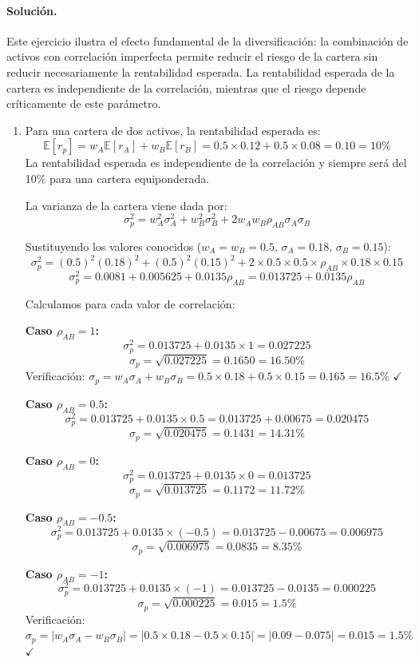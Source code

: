 \documentclass[12pt,a4paper]{article}
\newcommand{\E}{\mathbb{E}}
\newenvironment{solucion}{\paragraph{Solución.}}{}
\begin{document}
\begin{solucion}
Este ejercicio ilustra el efecto fundamental de la diversificación: la combinación de activos con correlación imperfecta permite reducir el riesgo de la cartera sin reducir necesariamente la rentabilidad esperada. La rentabilidad esperada de la cartera es independiente de la correlación, mientras que el riesgo depende críticamente de este parámetro.

\begin{enumerate}[label=\alph*)]
  \item Para una cartera de dos activos, la rentabilidad esperada es:
  \[
  \E[r_p] = w_A \E[r_A] + w_B \E[r_B] = 0.5 \times 0.12 + 0.5 \times 0.08 = 0.10 = 10\%
  \]
  La rentabilidad esperada es independiente de la correlación y siempre será del 10\% para una cartera equiponderada.

  La varianza de la cartera viene dada por:
  \[
  \sigma_p^2 = w_A^2 \sigma_A^2 + w_B^2 \sigma_B^2 + 2w_A w_B \rho_{AB} \sigma_A \sigma_B
  \]
  
  Sustituyendo los valores conocidos ($w_A = w_B = 0.5$, $\sigma_A = 0.18$, $\sigma_B = 0.15$):
  \[
  \sigma_p^2 = (0.5)^2 (0.18)^2 + (0.5)^2 (0.15)^2 + 2 \times 0.5 \times 0.5 \times \rho_{AB} \times 0.18 \times 0.15
  \]
  \[
  \sigma_p^2 = 0.0081 + 0.005625 + 0.0135 \rho_{AB} = 0.013725 + 0.0135 \rho_{AB}
  \]

  Calculamos para cada valor de correlación:

  \textbf{Caso $\rho_{AB} = 1$:}
  \[
  \sigma_p^2 = 0.013725 + 0.0135 \times 1 = 0.027225
  \]
  \[
  \sigma_p = \sqrt{0.027225} = 0.1650 = 16.50\%
  \]
  Verificación: $\sigma_p = w_A \sigma_A + w_B \sigma_B = 0.5 \times 0.18 + 0.5 \times 0.15 = 0.165 = 16.5\%$ $\checkmark$

  \textbf{Caso $\rho_{AB} = 0.5$:}
  \[
  \sigma_p^2 = 0.013725 + 0.0135 \times 0.5 = 0.013725 + 0.00675 = 0.020475
  \]
  \[
  \sigma_p = \sqrt{0.020475} = 0.1431 = 14.31\%
  \]

  \textbf{Caso $\rho_{AB} = 0$:}
  \[
  \sigma_p^2 = 0.013725 + 0.0135 \times 0 = 0.013725
  \]
  \[
  \sigma_p = \sqrt{0.013725} = 0.1172 = 11.72\%
  \]

  \textbf{Caso $\rho_{AB} = -0.5$:}
  \[
  \sigma_p^2 = 0.013725 + 0.0135 \times (-0.5) = 0.013725 - 0.00675 = 0.006975
  \]
  \[
  \sigma_p = \sqrt{0.006975} = 0.0835 = 8.35\%
  \]

  \textbf{Caso $\rho_{AB} = -1$:}
  \[
  \sigma_p^2 = 0.013725 + 0.0135 \times (-1) = 0.013725 - 0.0135 = 0.000225
  \]
  \[
  \sigma_p = \sqrt{0.000225} = 0.015 = 1.5\%
  \]
  Verificación: $\sigma_p = |w_A \sigma_A - w_B \sigma_B| = |0.5 \times 0.18 - 0.5 \times 0.15| = |0.09 - 0.075| = 0.015 = 1.5\%$ $\checkmark$


\end{enumerate}
\end{solucion}
\end{document}
